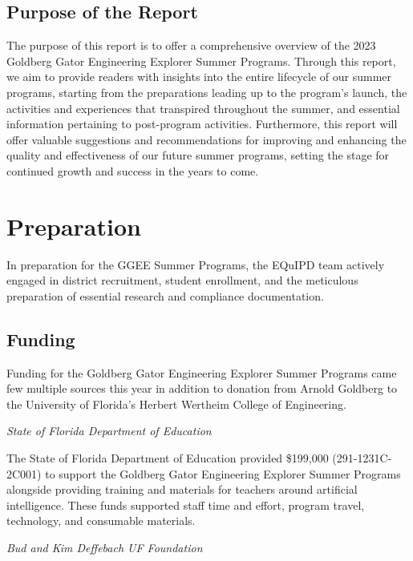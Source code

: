 \documentclass[
]{article}
\begin{document}
\hypertarget{purpose-of-the-report}{%
\subsection{Purpose of the Report}\label{purpose-of-the-report}}

The purpose of this report is to offer a comprehensive overview of the
2023 Goldberg Gator Engineering Explorer Summer Programs. Through this
report, we aim to provide readers with insights into the entire
lifecycle of our summer programs, starting from the preparations leading
up to the program's launch, the activities and experiences that
transpired throughout the summer, and essential information pertaining
to post-program activities. Furthermore, this report will offer valuable
suggestions and recommendations for improving and enhancing the quality
and effectiveness of our future summer programs, setting the stage for
continued growth and success in the years to come.

\hypertarget{preparation}{%
\section{Preparation}\label{preparation}}

In preparation for the GGEE Summer Programs, the EQuIPD team actively
engaged in district recruitment, student enrollment, and the meticulous
preparation of essential research and compliance documentation.

\hypertarget{funding}{%
\subsection{Funding}\label{funding}}

Funding for the Goldberg Gator Engineering Explorer Summer Programs came
few multiple sources this year in addition to donation from Arnold
Goldberg to the University of Florida's Herbert Wertheim College of
Engineering.

\emph{State of Florida Department of Education}

The State of Florida Department of Education provided \$199,000
(291-1231C-2C001) to support the Goldberg Gator Engineering Explorer
Summer Programs alongside providing training and materials for teachers
around artificial intelligence. These funds supported staff time and
effort, program travel, technology, and consumable materials.

\emph{Bud and Kim Deffebach UF Foundation}
\end{document}
